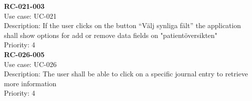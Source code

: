 \textbf{RC-021-003} \\
Use case: UC-021 \\
Description: If the user clicks on the button “Välj synliga fält” the application shall show options for add or remove data fields on "patientöversikten" \\
Priority: 4 \\
\newline
\textbf{RC-026-005} \\
Use case: UC-026 \\
Description: The user shall be able to click on a specific journal entry to retrieve more information\\
Priority: 4 \\
\newline